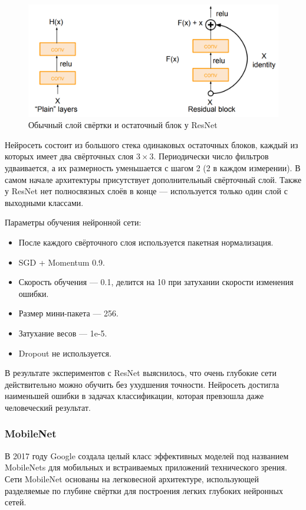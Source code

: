 \begin{figure}
    \centering
    \includegraphics[width=\textwidth*2/3]{images/res_block.png}
    \caption{Обычный слой свёртки и остаточный блок у ResNet}
    \label{fig:my_label}
\end{figure}


Нейросеть состоит из большого стека одинаковых остаточных блоков, каждый из которых имеет два свёрточных слоя $3 \times 3$. Периодически число фильтров удваивается, а их размерность уменьшается с шагом 2 (2 в каждом измерении). В самом начале архитектуры присутствует дополнительный свёрточный слой. Также у ResNet нет полносвязных слоёв в конце — используется только один слой с выходными классами.

Параметры обучения нейронной сети:
\begin{itemize}
    \item После каждого свёрточного слоя используется пакетная нормализация.
    \item SGD + Momentum 0.9.
    \item Скорость обучения — 0.1, делится на 10 при затухании скорости изменения ошибки.
    \item Размер мини-пакета — 256.
    \item Затухание весов — 1e-5.
    \item Dropout не используется.
\end{itemize}

В результате экспериментов с ResNet выяснилось, что очень глубокие сети действительно можно обучить без ухудшения точности. Нейросеть достигла наименьшей ошибки в задачах классификации, которая превзошла даже человеческий результат.

\subsubsection{MobileNet} \label{mobilenet_rev}
В 2017 году Google создала целый класс эффективных моделей под названием MobileNets для мобильных и встраиваемых приложений технического зрения. Сети MobileNet основаны на легковесной архитектуре, использующей разделяемые по глубине свёртки для построения легких глубоких нейронных сетей. 

